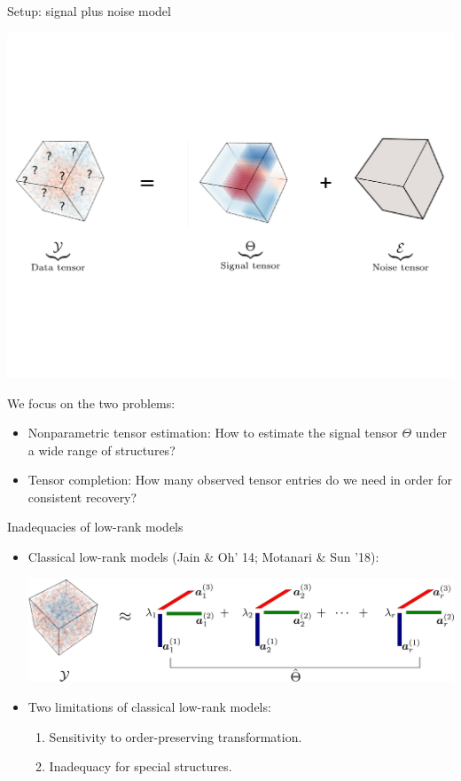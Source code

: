 \documentclass[10pt, mathserif]{beamer} %
\theoremstyle{definition}
\theoremstyle{plain}
\begin{document}
\begin{frame}{Setup: signal plus noise model}
     \begin{center}
    \includegraphics[width =\textwidth]{Figures/signalnoise.pdf}
    \end{center}
    We focus on the two problems:
    \begin{itemize}
        \item Nonparametric tensor estimation: How to estimate the signal tensor $\Theta$ under {\color{red}a wide range of structures}?
        \item Tensor completion: How many {\color{red}observed tensor entries} do we need in order for consistent recovery?
    \end{itemize}
\end{frame}

\begin{frame}{Inadequacies of low-rank models}
 \begin{itemize}
 \item Classical low-rank models (Jain \& Oh' 14; Motanari \& Sun '18):
 \\[.5cm]

   \begin{center}
    \includegraphics[width =\textwidth]{Figures/classic.pdf}
    \end{center}

     \item Two limitations of classical low-rank models:
     \begin{enumerate}
         \item Sensitivity to order-preserving transformation.
         \item Inadequacy for special structures.
     \end{enumerate}
 \end{itemize}
\end{frame}
\end{document}
